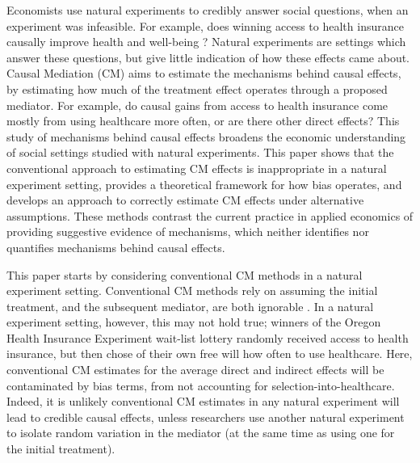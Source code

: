 Economists use natural experiments to credibly answer social questions, when an experiment was infeasible.
For example, does winning access to health insurance causally improve health and well-being \citep{finkelstein2008oregon}?
Natural experiments are settings which answer these questions, but give little indication of how these effects came about.
Causal Mediation (CM) aims to estimate the mechanisms behind causal effects, by estimating how much of the treatment effect operates through a proposed mediator.
For example, do causal gains from access to health insurance come mostly from using healthcare more often, or are there other direct effects?
This study of mechanisms behind causal effects broadens the economic understanding of social settings studied with natural experiments.
This paper shows that the conventional approach to estimating CM effects is inappropriate in a natural experiment setting, provides a theoretical framework for how bias operates, and develops an approach to correctly estimate CM effects under alternative assumptions.
These methods contrast the current practice in applied economics of providing suggestive evidence of mechanisms, which neither identifies nor quantifies mechanisms behind causal effects.


This paper starts by considering conventional CM methods in a natural experiment setting.
Conventional CM methods rely on assuming the initial treatment, and the subsequent mediator, are both ignorable \citep{imai2010identification}.
In a natural experiment setting, however, this may not hold true; 
winners of the Oregon Health Insurance Experiment wait-list lottery randomly received access to health insurance, but then chose of their own free will how often to use healthcare.
Here, conventional CM estimates for the average direct and indirect effects will be contaminated by bias terms, from not accounting for selection-into-healthcare.
Indeed, it is unlikely conventional CM estimates in any natural experiment will lead to credible causal effects, unless researchers use another natural experiment to isolate random variation in the mediator (at the same time as using one for the initial treatment).

